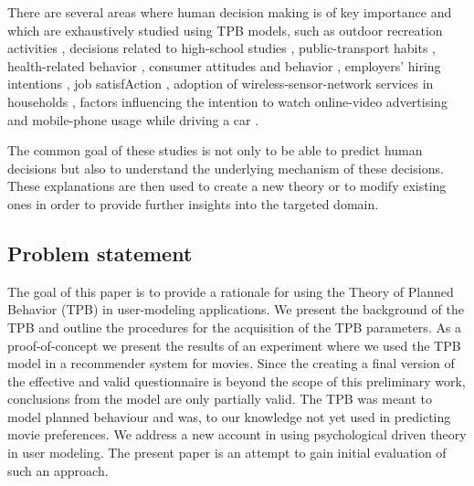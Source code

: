\documentclass{llncs}
\begin{document}
 
There are several areas where human decision making is of key importance and which are exhaustively studied using TPB models, such as outdoor recreation activities \cite{Daigle2002}, decisions related to high-school studies \cite{Davis2002}, public-transport habits \cite{Bamberg2003}, health-related behavior \cite{Ajzen2007},  consumer attitudes and behavior \cite{Ajzen2008}, employers’ hiring intentions \cite{Fraser2010}, job satisfAction \cite{IcekAjzen2011}, adoption of wireless-sensor-network services in households \cite{Lin2011}, factors influencing the intention to watch online-video advertising \cite{Lee2011} and mobile-phone usage while driving a car \cite{Walsh2008}.%

The common goal of these studies is not only to be able to predict human decisions but also to understand the underlying mechanism of these decisions. These explanations are then used to create a new theory or to modify existing ones in order to provide further insights into the targeted domain.





\subsection{Problem statement}\label{SubSec_}

The goal of this paper is to provide a rationale for using the Theory of Planned Behavior (TPB) in user-modeling applications. We present the background of the TPB and outline the procedures for the acquisition of the TPB parameters. As a proof-of-concept we present the results of an experiment where we used the TPB model in a recommender system for movies. Since the creating a final version of the effective and valid questionnaire is beyond the scope of this preliminary work,  conclusions from the model are only partially valid. The TPB was meant to model planned behaviour and was, to our knowledge not yet used in predicting movie preferences. We address a new account in using psychological driven theory in user modeling. The present paper is an attempt to gain initial evaluation of such an approach.
\end{document}
